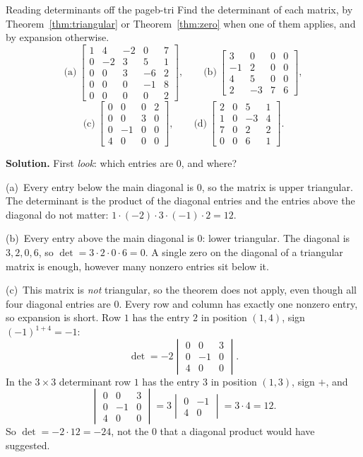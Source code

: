 \documentclass[11pt]{article}
\begin{document}
\begin{exmp}{Reading determinants off the page}{b-tri}
Find the determinant of each matrix, by Theorem~\ref{thm:triangular} or Theorem~\ref{thm:zero} when one of them applies, and by expansion otherwise.
\[
\text{(a)}\ \begin{bmatrix}1&4&-2&0&7\\0&-2&3&5&1\\0&0&3&-6&2\\0&0&0&-1&8\\0&0&0&0&2\end{bmatrix},\qquad
\text{(b)}\ \begin{bmatrix}3&0&0&0\\-1&2&0&0\\4&5&0&0\\2&-3&7&6\end{bmatrix},
\]
\[
\text{(c)}\ \begin{bmatrix}0&0&0&2\\0&0&3&0\\0&-1&0&0\\4&0&0&0\end{bmatrix},\qquad
\text{(d)}\ \begin{bmatrix}2&0&5&1\\1&0&-3&4\\7&0&2&2\\0&0&6&1\end{bmatrix}.
\]

\textbf{Solution.} First \emph{look}: which entries are $0$, and where?

(a)~Every entry below the main diagonal is $0$, so the matrix is upper triangular. The determinant is the product of the diagonal entries and the entries above the diagonal do not matter: $1\cdot(-2)\cdot3\cdot(-1)\cdot2=12$.

(b)~Every entry above the main diagonal is $0$: lower triangular. The diagonal is $3,2,0,6$, so $\det=3\cdot2\cdot0\cdot6=0$. A single zero on the diagonal of a triangular matrix is enough, however many nonzero entries sit below it.

(c)~This matrix is \emph{not} triangular, so the theorem does not apply, even though all four diagonal entries are $0$. Every row and column has exactly one nonzero entry, so expansion is short. Row $1$ has the entry $2$ in position $(1,4)$, sign $(-1)^{1+4}=-1$:
\[
\det=-2\begin{vmatrix}0&0&3\\0&-1&0\\4&0&0\end{vmatrix}.
\]
In the $3\times3$ determinant row $1$ has the entry $3$ in position $(1,3)$, sign $+$, and
\[
\begin{vmatrix}0&0&3\\0&-1&0\\4&0&0\end{vmatrix}=3\begin{vmatrix}0&-1\\4&0\end{vmatrix}=3\cdot4=12.
\]
So $\det=-2\cdot12=-24$, not the $0$ that a diagonal product would have suggested.


\end{exmp}
\end{document}
